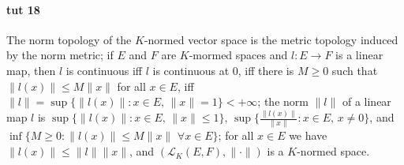 \documentclass[a4paper]{article}
\newcommand{\Lcal}{\mathcal{L}}
\begin{document}


\paragraph{tut 18} %
\label{par:tut_18}

The norm topology of the $K$-normed vector space is the metric topology induced by
the norm metric;
%
if $E$ and $F$ are $K$-mormed spaces and $l\colon E \to F$ is a linear map, then
$l$ is continuous iff $l$ is continuous at $0$, iff there is $M\geq 0$ such that
$\|l(x)\| \leq M \|x\|$ for all $x\in E$, iff
$\|l\| = \sup\{\|l(x)\|\colon x\in E,\, \|x\|=1\} < +\infty$;
%
the norm $\|l\|$ of a linear map $l$ is $\sup\{\|l(x)\|\colon x\in E,\, \|x\| \leq 1\}$,
$\sup\{\tfrac{\|l(x)\|}{\|x\|} \colon x\in E,\, x\neq 0\}$, and
$\inf\{M\geq 0\colon \|l(x)\| \leq M \|x\|\,\,\forall{x\in E} \}$;
%
for all $x\in E$ we have $\|l(x)\| \leq \|l\| \|x\|$, and $(\Lcal_K(E, F), \|\cdot\|)$
is a $K$-normed space.
\end{document}
